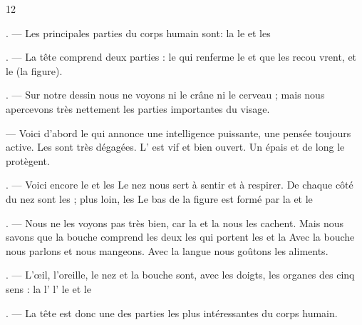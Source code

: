 \begin{VUpage}[14]{12}
\VUsaut{2.0mm}
\VUsaut{2.4mm}
\VUsaut{4.0mm}

\VUsaut{2.4mm}
\VUsaut{3.4mm}

. --- Les principales parties du corps humain sont:\nl
la  le  et les 

. --- La tête comprend deux parties : le \nl
qui renferme le  et que les  recou\cc
vrent, et le  (la figure).

. --- Sur notre dessin nous ne voyons ni le crâne\nl
ni le cerveau ; mais nous apercevons très nettement\nl
les parties importantes du visage.

 --- Voici d'abord le  qui annonce une\nl
intelligence puissante, une pensée toujours active.\nl
Les  sont très dégagées. L' est vif et\nl
bien ouvert. Un épais  et de long  le\nl
protègent.

. --- Voici encore le  et les  Le nez\nl
nous sert à sentir et à respirer. De chaque côté du\nl
nez sont les  ; plus loin, les  Le bas\nl
de la figure est formé par la  et le 

. --- Nous ne les voyons pas très bien, car la\nl
{} et la  nous les cachent. Mais\nl
nous savons que la bouche comprend les deux\nl
{} les  qui portent les \nl
et la  Avec la bouche nous parlons et nous\nl
mangeons. Avec la langue nous goûtons les aliments.

. --- L'œil, l'oreille, le nez et la bouche sont, avec\nl
les doigts, les organes des cinq sens : la  l'\nl
l' le  et le 

. --- La tête est donc une des parties les plus\nl
intéressantes du corps humain.
\end{VUpage}

